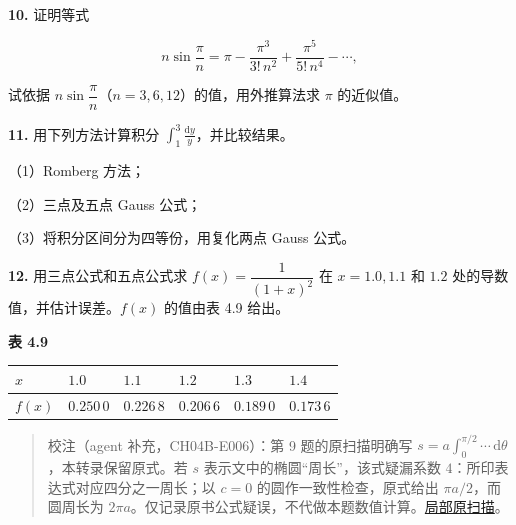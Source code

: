 \textbf{10.} 证明等式

\[
n\sin\frac\pi n=\pi-\frac{\pi^3}{3!\,n^2}+\frac{\pi^5}{5!\,n^4}-\cdots,
\]

试依据 \(n\sin\dfrac\pi n\)（\(n=3,6,12\)）的值，用外推算法求 \(\pi\) 的近似值。

\textbf{11.} 用下列方法计算积分 \(\displaystyle\int_1^3\frac{\mathrm{d}y}{y}\)，并比较结果。

（1）Romberg 方法；

（2）三点及五点 Gauss 公式；

（3）将积分区间分为四等份，用复化两点 Gauss 公式。

\textbf{12.} 用三点公式和五点公式求 \(f(x)=\dfrac1{(1+x)^2}\) 在 \(x=1.0,1.1\) 和 \(1.2\) 处的导数值，并估计误差。\(f(x)\) 的值由表 4.9 给出。

\textbf{表 4.9}

{\def\LTcaptype{none} %
\begin{longtable}[]{@{}
  >{\centering\arraybackslash}p{}
  >{\centering\arraybackslash}p{}
  >{\centering\arraybackslash}p{}
  >{\centering\arraybackslash}p{}
  >{\centering\arraybackslash}p{}
  >{\centering\arraybackslash}p{}@{}}
\toprule\noalign{}
\begin{minipage}[b]{\linewidth}\centering
\(x\)
\end{minipage} & \begin{minipage}[b]{\linewidth}\centering
\(1.0\)
\end{minipage} & \begin{minipage}[b]{\linewidth}\centering
\(1.1\)
\end{minipage} & \begin{minipage}[b]{\linewidth}\centering
\(1.2\)
\end{minipage} & \begin{minipage}[b]{\linewidth}\centering
\(1.3\)
\end{minipage} & \begin{minipage}[b]{\linewidth}\centering
\(1.4\)
\end{minipage} \\
\midrule\noalign{}
\endhead
\bottomrule\noalign{}
\endlastfoot
\(f(x)\) & \(0.250\,0\) & \(0.226\,8\) & \(0.206\,6\) & \(0.189\,0\) & \(0.173\,6\) \\
\end{longtable}
}

\begin{quote}
校注（agent 补充，CH04B-E006）：第 9 题的原扫描明确写 \(s=a\int_0^{\pi/2}\cdots\,\mathrm{d}\theta\)，本转录保留原式。若 \(s\) 表示文中的椭圆``周长''，该式疑漏系数 \(4\)：所印表达式对应四分之一周长；以 \(c=0\) 的圆作一致性检查，原式给出 \(\pi a/2\)，而圆周长为 \(2\pi a\)。仅记录原书公式疑误，不代做本题数值计算。\href{verified/assets/ch04b/review-p118-orbit.png}{局部原扫描}。
\end{quote}

